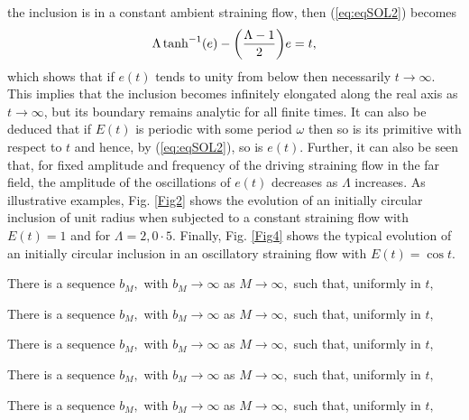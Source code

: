 \documentclass[fleqn]{jleo}
\begin{document}
the inclusion is in a constant ambient straining flow, then
(\ref{eq:eqSOL2})  becomes
\begin{equation}
\Lambda \tanh^{-1}(e) -{\left({\Lambda -1 \over 2}\right)} e=  t,
\end{equation}
which shows that if $e(t)$ tends to unity
from below then necessarily $t \to \infty$. This implies  that the inclusion
becomes infinitely elongated along the real axis as $t \to \infty$,
but its boundary remains analytic for all finite times.
It can also be deduced that if $E(t)$ is periodic with some period $\omega$
then so is its primitive with respect to $t$ and hence, by (\ref{eq:eqSOL2}),
so is $e(t)$. Further, it can also be seen that, for fixed amplitude and frequency of the driving straining flow in the far field,
the amplitude of the oscillations of $e(t)$ decreases as $\Lambda$ increases.
As illustrative examples, Fig. \ref{Fig2} shows the evolution
of an initially circular inclusion of unit radius when subjected
to a constant straining flow with $E(t)=1$ and for $\Lambda=2, 0{\cdot}5$.
Finally, Fig. \ref{Fig4} shows the typical evolution of
an initially circular inclusion in an oscillatory straining
flow with $E(t)=\cos t$.
\begin{cor}
There is a sequence $b_{M},$ with $%
b_{M}\rightarrow \infty $ as $M\rightarrow \infty ,$ such that, uniformly in
$t,$
\end{cor}
\begin{cor}
There is a sequence $b_{M},$ with $%
b_{M}\rightarrow \infty $ as $M\rightarrow \infty ,$ such that, uniformly in
$t,$
\end{cor}
\begin{prop}
There is a sequence $b_{M},$ with $%
b_{M}\rightarrow \infty $ as $M\rightarrow \infty ,$ such that, uniformly in
$t,$
\end{prop}

\begin{theorem}
There is a sequence $b_{M},$ with $%
b_{M}\rightarrow \infty $ as $M\rightarrow \infty ,$ such that, uniformly in
$t,$
\end{theorem}
\begin{assum}
There is a sequence $b_{M},$ with $%
b_{M}\rightarrow \infty $ as $M\rightarrow \infty ,$ such that, uniformly in
$t,$
\end{assum}
\end{document}
